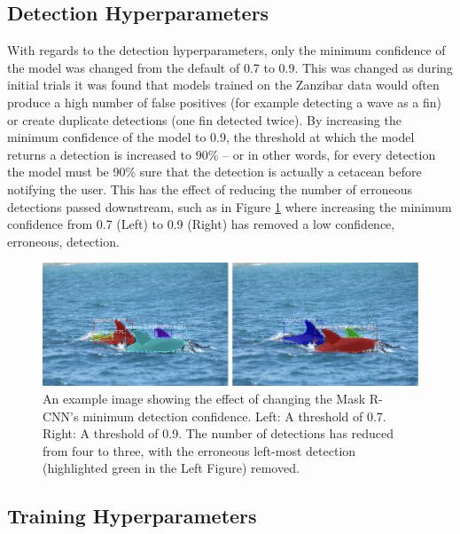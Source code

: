 \subsection{Detection Hyperparameters}\label{ch:cetDet,sec:ModelSelection,sub:DetectionHyperparameters}
 
 With regards to the detection hyperparameters, only the minimum confidence of the model was changed from the default of 0.7 to 0.9. This was changed as during initial trials it was found that models trained on the Zanzibar data would often produce a high number of false positives (for example detecting a wave as a fin) or create duplicate detections (one fin detected twice). By increasing the minimum confidence of the model to 0.9, the threshold at which the model returns a detection is increased to 90\% -- or in other words, for every detection the model must be 90\% sure that the detection is actually a cetacean before notifying the user. This has the effect of reducing the number of erroneous detections passed downstream, such as in Figure \ref{fig:min-conf} where increasing the minimum confidence from 0.7 (Left) to 0.9 (Right) has removed a low confidence, erroneous, detection. 
 
\begin{figure}[h]
	\begin{center}
		\includegraphics[scale=0.55]{Chapter3/figs/min-conf-eg.png}
	\end{center}
	\caption[An example image showing the effect of changing the Mask R-CNN's minimum detection confidence.]{An example image showing the effect of changing the Mask R-CNN's minimum detection confidence. Left: A threshold of 0.7. Right: A threshold of 0.9. The number of detections has reduced from four to three, with the erroneous left-most detection (highlighted green in the Left Figure) removed.}
	\label{fig:min-conf}
\end{figure}
 
 
\subsection{Training Hyperparameters}\label{ch:cetDet,sec:ModelSelection,sub:TrainingHyperparameters}

